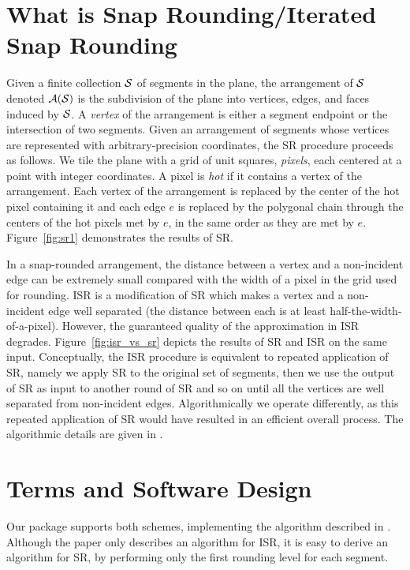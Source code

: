 \section{What is Snap Rounding/Iterated Snap Rounding}
Given a finite collection $\S$ of segments in the plane, the
arrangement of $\S$ denoted $\A(\S)$ is the subdivision of the plane
into vertices, edges, and faces induced by $\S$. %
A {\it vertex\/} of the arrangement is either a segment endpoint or
the intersection of two segments. Given an arrangement of segments
whose vertices are represented with arbitrary-precision coordinates,
the SR procedure
proceeds as follows. We tile the plane
with a grid of unit squares, {\it pixels}, each centered at a point
with integer coordinates. A pixel is {\it hot\/} if it contains a
vertex of the arrangement. Each vertex of the arrangement is replaced
by the center of the hot pixel containing it and each edge $e$ is
replaced by the polygonal chain through the centers of the hot pixels
met by $e$, in the same order as they are met by $e$. 
Figure~\ref{fig:sr1} demonstrates the results of SR.

In a snap-rounded arrangement, the distance between a vertex and
a non-incident edge can be extremely small compared with the width of a
pixel in the grid used for rounding. ISR
is a modification of SR which makes a vertex and a
non-incident edge well separated (the distance between each is at least
half-the-width-of-a-pixel). However, the guaranteed quality of the
approximation in ISR degrades. Figure~\ref{fig:isr_vs_sr} depicts
the results of SR and ISR on the same input.
Conceptually, the ISR procedure is equivalent to repeated application
of SR, namely we apply SR to the original set of segments, then we use
the output of SR as input to another round of SR and so on until all the
vertices are well separated from non-incident edges. Algorithmically
we operate differently, as this repeated application of SR would have
resulted in an efficient overall process. The algorithmic details are
given in \cite{cgal:hp-isr-02}.

\section{Terms and Software Design}

Our package supports both schemes, implementing the algorithm
described in \cite{cgal:hp-isr-02}.
Although the paper only describes an algorithm for ISR,
it is easy to derive an algorithm for SR, by performing only
the first rounding level for each segment.

